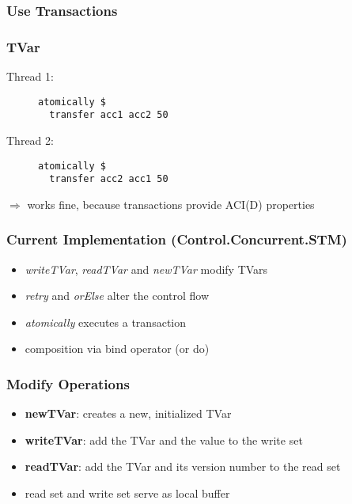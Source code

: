 \documentclass{beamer}
\begin{document}
  \begin{frame}
    \frametitle{Use Transactions}
       
  \end{frame}
  
  \begin{frame}[fragile]
    \frametitle{TVar}
    \fboxsep=0pt
    \noindent
    \begin{minipage}[t]{0.48\linewidth}
      Thread 1:
      \begin{figure}
       \begin{lstlisting}[frame=single]
atomically $ 
  transfer acc1 acc2 50
       \end{lstlisting}
      \end{figure}
    \end{minipage}%
    \hfill%
    \begin{minipage}[t]{0.48\linewidth}
      Thread 2:
      \begin{figure}
       \begin{lstlisting}[frame=single]
atomically $ 
  transfer acc2 acc1 50
       \end{lstlisting}
      \end{figure}
    \end{minipage}
    \vfill
    \pause
    $\Rightarrow$ works fine, because transactions provide ACI(D) properties
\end{frame}
  \begin{frame}
    \frametitle{Current Implementation (Control.Concurrent.STM)}
    \begin{itemize}\setlength\itemsep{1em}
      \item \textit{writeTVar}, \textit{readTVar} and \textit{newTVar} modify TVars
      \item \textit{retry} and \textit{orElse} alter the control flow
      \item \textit{atomically} executes a transaction 
      \item composition via bind operator (or do)
    \end{itemize}
  \end{frame}
  
  \begin{frame}
   \frametitle{Modify Operations}
   \begin{itemize}\setlength\itemsep{1em}
    \item \textbf{newTVar}: creates a new, initialized TVar 
    \item \textbf{writeTVar}: add the TVar and the value to the write set
    \item \textbf{readTVar}: add the TVar and its version number to the read set
    \item read set and write set serve as local buffer 
  \end{itemize}
  \end{frame}
  
\end{document}
